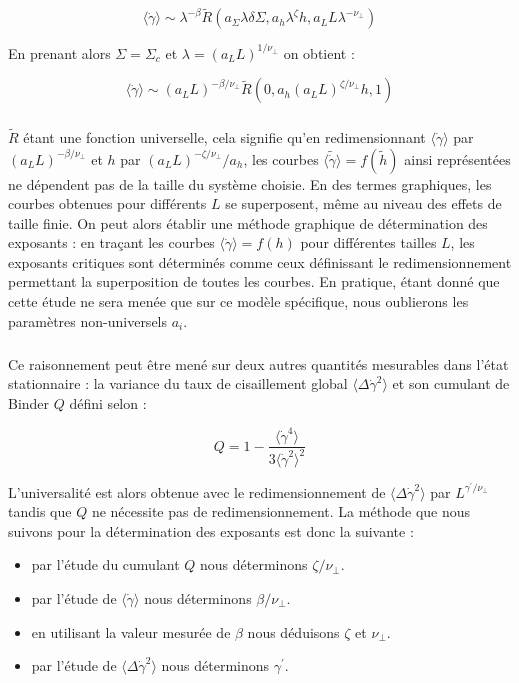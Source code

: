 \begin{equation}
    \langle\dot{\gamma}\rangle \sim \lambda^{-\beta}\tilde{R}(a_\Sigma \lambda\delta\Sigma,a_h\lambda^\zeta h, a_L L \lambda^{-\nu_\perp})
\end{equation}

\noindent En prenant alors $\Sigma=\Sigma_c$ et $\lambda=(a_LL)^{1/\nu_\perp}$ on obtient :

\begin{equation}
    \langle\dot{\gamma}\rangle \sim (a_LL)^{-\beta/\nu_\perp}\tilde{R}(0, a_h(a_LL)^{\zeta/\nu_\perp} h, 1)
\end{equation}

\subparagraph{}$\tilde{R}$ étant une fonction universelle, cela signifie qu'en redimensionnant $\langle\dot{\gamma}\rangle $ par $(a_LL)^{-\beta/\nu_\perp}$ et $h$ par $(a_LL)^{-\zeta/\nu_\perp}/a_h$, les courbes $\langle\tilde{\dot{\gamma}}\rangle = f(\tilde{h})$ ainsi représentées ne dépendent pas de la taille du système choisie. En des termes graphiques, les courbes obtenues pour différents $L$ se superposent, même au niveau des effets de taille finie. On peut alors établir une méthode graphique de détermination des exposants : en traçant les courbes $\langle \dot{\gamma} \rangle = f(h)$ pour différentes tailles $L$, les exposants critiques sont déterminés comme ceux définissant le redimensionnement permettant la superposition de toutes les courbes. En pratique, étant donné que cette étude ne sera menée que sur ce modèle spécifique, nous oublierons les paramètres non-universels $a_i$.

\subparagraph{}Ce raisonnement peut être mené sur deux autres quantités mesurables dans l'état stationnaire : la variance du taux de cisaillement global $\langle\Delta\dot{\gamma}^2\rangle$ et son cumulant de Binder $Q$ \cite{binder_finite_1981} défini selon :

\begin{equation}
    Q = 1 - \frac{\langle\dot{\gamma}^4\rangle}{3\langle\dot{\gamma}^2\rangle^2}
\end{equation}

\noindent L'universalité est alors obtenue avec le redimensionnement de $\langle\Delta\dot{\gamma}^2\rangle$ par $L^{\gamma^\prime/\nu_\perp}$ tandis que $Q$ ne nécessite pas de redimensionnement. La méthode que nous suivons pour la détermination des exposants est donc la suivante : 

\begin{itemize}
	\item par l'étude du cumulant $Q$ nous déterminons $\zeta/\nu_\perp$.
	\item par l'étude de $\langle\dot{\gamma}\rangle$ nous déterminons $\beta/\nu_\perp$.
	\item en utilisant la valeur mesurée de $\beta$ nous déduisons $\zeta$ et $\nu_\perp$.
	\item par l'étude de $\langle\Delta\dot{\gamma}^2\rangle$ nous déterminons $\gamma^\prime$.
\end{itemize}

